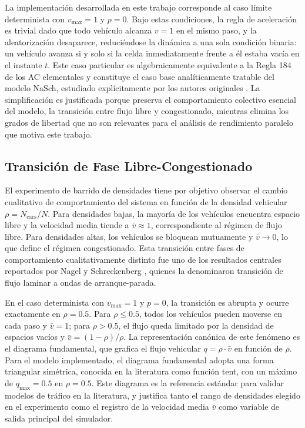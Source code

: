 La implementación desarrollada en este trabajo corresponde al caso límite
determinista con $v_{\max} = 1$ y $p = 0$. Bajo estas condiciones, la
regla de aceleración es trivial dado que todo vehículo alcanza $v = 1$
en el mismo paso, y la aleatorización desaparece, reduciéndose la
dinámica a una sola condición binaria: un vehículo avanza si y solo si
la celda inmediatamente frente a él estaba vacía en el instante $t$. Este
caso particular es algebraicamente equivalente a la Regla 184 de los AC
elementales y constituye el caso base analíticamente tratable del modelo
NaSch, estudiado explícitamente por los autores originales
\parencite{NagelSchreckenberg1992}. La simplificación es justificada
porque preserva el comportamiento colectivo esencial del modelo, la
transición entre flujo libre y congestionado, mientras elimina los
grados de libertad que no son relevantes para el análisis de rendimiento
paralelo que motiva este trabajo.

\subsection{Transición de Fase Libre-Congestionado}

El experimento de barrido de densidades tiene por objetivo observar el
cambio cualitativo de comportamiento del sistema en función de la
densidad vehicular $\rho = N_{\mathrm{cars}} / N$. Para densidades bajas,
la mayoría de los vehículos encuentra espacio libre y la velocidad media
tiende a $\bar{v} \approx 1$, correspondiente al régimen de flujo libre.
Para densidades altas, los vehículos se bloquean mutuamente y $\bar{v}
\to 0$, lo que define el régimen congestionado. Esta transición entre
fases de comportamiento cualitativamente distinto fue uno de los
resultados centrales reportados por Nagel y Schreckenberg
\parencite{NagelSchreckenberg1992}, quienes la denominaron transición de
flujo laminar a ondas de arranque-parada.

En el caso determinista con $v_{\max} = 1$ y $p = 0$, la transición es
abrupta y ocurre exactamente en $\rho = 0.5$. Para $\rho \leq 0.5$,
todos los vehículos pueden moverse en cada paso y $\bar{v} = 1$; para
$\rho > 0.5$, el flujo queda limitado por la densidad de espacios vacíos
y $\bar{v} = (1 - \rho) / \rho$. La representación canónica de este
fenómeno es el diagrama fundamental, que grafica el flujo vehicular
$q = \rho \cdot \bar{v}$ en función de $\rho$. Para el modelo
implementado, el diagrama fundamental adopta una forma triangular
simétrica, conocida en la literatura como función tent, con un máximo
de $q_{\max} = 0.5$ en $\rho = 0.5$. Este diagrama es la referencia
estándar para validar modelos de tráfico en la literatura, y justifica
tanto el rango de densidades elegido en el experimento como el registro
de la velocidad media $\bar{v}$ como variable de salida principal del
simulador.

